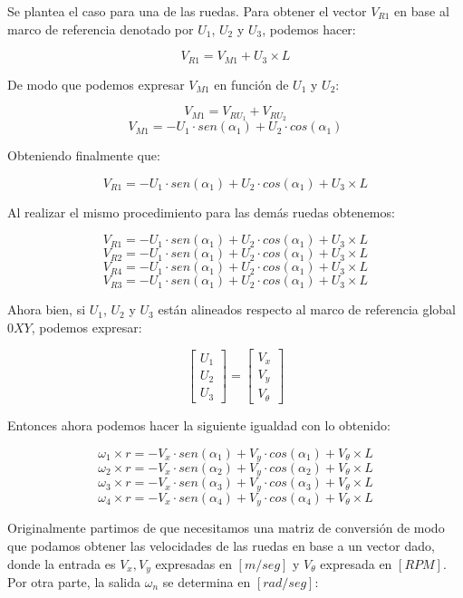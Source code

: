 Se plantea el caso para una de las ruedas. Para obtener el vector $V_{R1}$ en base al marco de referencia denotado por $U_1$, $U_2$ y $U_3$, podemos hacer:

$$ V_{R1} = V_{M1} + U_3 \times L $$

De modo que podemos expresar $V_{M1}$ en función de $U_1$ y $U_2$:

$$ V_{M1} = V_{RU_1} + V_{RU_2} $$
$$ V_{M1} = -U_1 \cdot sen(\alpha_1) + U_2 \cdot cos(\alpha_1) $$

Obteniendo finalmente que:

$$ V_{R1} = -U_1 \cdot sen(\alpha_1) + U_2 \cdot cos(\alpha_1) + U_3 \times L $$

Al realizar el mismo procedimiento para las demás ruedas obtenemos:

$$ V_{R1} = -U_1 \cdot sen(\alpha_1) + U_2 \cdot cos(\alpha_1) + U_3 \times L $$
$$ V_{R2} = -U_1 \cdot sen(\alpha_1) + U_2 \cdot cos(\alpha_1) + U_3 \times L $$
$$ V_{R4} = -U_1 \cdot sen(\alpha_1) + U_2 \cdot cos(\alpha_1) + U_3 \times L $$
$$ V_{R3} = -U_1 \cdot sen(\alpha_1) + U_2 \cdot cos(\alpha_1) + U_3 \times L $$

Ahora bien, si $U_1$, $U_2$ y $U_3$ están alineados respecto al marco de referencia global $0XY$, podemos expresar:

$$ \begin{bmatrix} U_1 \\ U_2 \\ U_3 \end{bmatrix} = \begin{bmatrix} V_x \\ V_y \\ V_\theta \end{bmatrix} $$

Entonces ahora podemos hacer la siguiente igualdad con lo obtenido:

$$ \omega_1 \times r = -V_x \cdot sen(\alpha_1) + V_y \cdot cos(\alpha_1) + V_\theta \times L $$
$$ \omega_2 \times r = -V_x \cdot sen(\alpha_2) + V_y \cdot cos(\alpha_2) + V_\theta \times L $$
$$ \omega_3 \times r = -V_x \cdot sen(\alpha_3) + V_y \cdot cos(\alpha_3) + V_\theta \times L $$
$$ \omega_4 \times r = -V_x \cdot sen(\alpha_4) + V_y \cdot cos(\alpha_4) + V_\theta \times L $$

Originalmente partimos de que necesitamos una matriz de conversión de modo que podamos obtener las velocidades de las ruedas en base a un vector dado, donde la entrada es $V_x, V_y$ expresadas en $[m/seg]$ y $V_\theta$ expresada en $[RPM]$. Por otra parte, la salida $\omega_n$ se determina en $[rad/seg]$:

